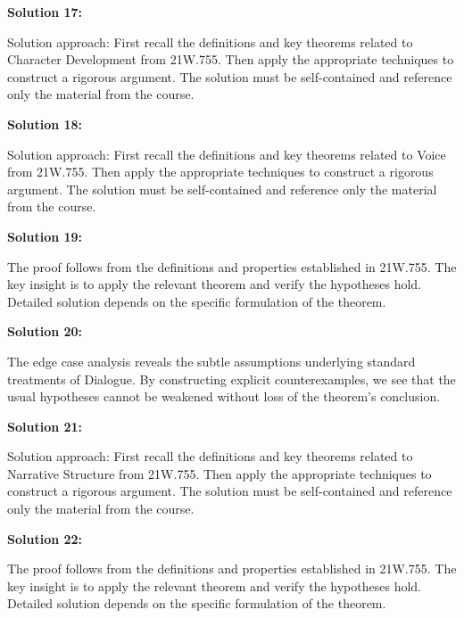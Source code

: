 \documentclass[12pt,a4paper]{exam}
\begin{document}
\textbf{Solution 17:}

Solution approach: First recall the definitions and key theorems related to Character Development from 21W.755. Then apply the appropriate techniques to construct a rigorous argument. The solution must be self-contained and reference only the material from the course.

\vspace{0.5cm}

\textbf{Solution 18:}

Solution approach: First recall the definitions and key theorems related to Voice from 21W.755. Then apply the appropriate techniques to construct a rigorous argument. The solution must be self-contained and reference only the material from the course.

\vspace{0.5cm}

\textbf{Solution 19:}

The proof follows from the definitions and properties established in 21W.755. The key insight is to apply the relevant theorem and verify the hypotheses hold. Detailed solution depends on the specific formulation of the theorem.

\vspace{0.5cm}

\textbf{Solution 20:}

The edge case analysis reveals the subtle assumptions underlying standard treatments of Dialogue. By constructing explicit counterexamples, we see that the usual hypotheses cannot be weakened without loss of the theorem's conclusion.

\vspace{0.5cm}

\textbf{Solution 21:}

Solution approach: First recall the definitions and key theorems related to Narrative Structure from 21W.755. Then apply the appropriate techniques to construct a rigorous argument. The solution must be self-contained and reference only the material from the course.

\vspace{0.5cm}

\textbf{Solution 22:}

The proof follows from the definitions and properties established in 21W.755. The key insight is to apply the relevant theorem and verify the hypotheses hold. Detailed solution depends on the specific formulation of the theorem.

\vspace{0.5cm}
\end{document}
